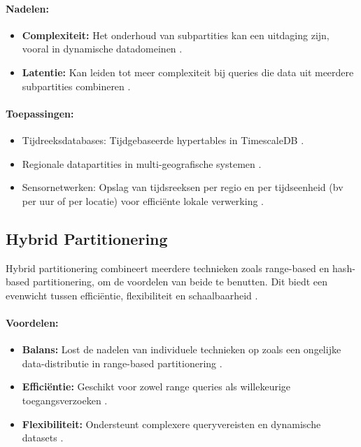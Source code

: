 \paragraph{Nadelen:}
\begin{itemize}
    \item \textbf{Complexiteit:} Het onderhoud van subpartities kan een uitdaging zijn, vooral in dynamische datadomeinen \autocite{Taheri2020}.
    \item \textbf{Latentie:} Kan leiden tot meer complexiteit bij queries die data uit meerdere subpartities combineren \autocite{Kleppmann2017}.
\end{itemize}

\paragraph{Toepassingen:}
\begin{itemize}
    \item Tijdreeksdatabases: Tijdgebaseerde hypertables in TimescaleDB \autocite{TimescaleDBDocumentation}.
    \item Regionale datapartities in multi-geografische systemen \autocite{Taheri2020}.
    \item Sensornetwerken: Opslag van tijdsreeksen per regio en per tijdseenheid (bv per uur of per locatie) voor efficiënte lokale verwerking \autocite{Kleppmann2017}.
\end{itemize}

\subsection{Hybrid Partitionering}
Hybrid partitionering combineert meerdere technieken zoals range-based en hash-based partitionering, om de voordelen van beide te benutten. Dit biedt een evenwicht tussen efficiëntie, flexibiliteit en schaalbaarheid \autocite{Ponnusamy2024}.

\paragraph{Voordelen:}
\begin{itemize}
    \item \textbf{Balans:} Lost de nadelen van individuele technieken op zoals een ongelijke data-distributie in range-based partitionering \autocite{Ponnusamy2024}.
    \item \textbf{Efficiëntie:} Geschikt voor zowel range queries als willekeurige toegangsverzoeken \autocite{Kleppmann2017}.
    \item \textbf{Flexibiliteit:} Ondersteunt complexere queryvereisten en dynamische datasets \autocite{Taheri2020}.
\end{itemize}


